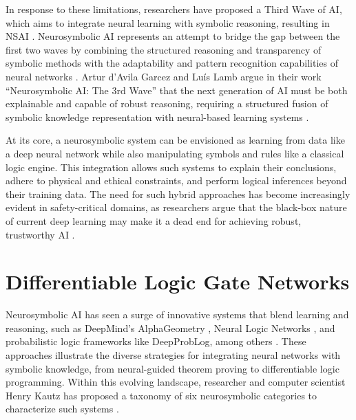 In response to these limitations, researchers have proposed a Third Wave of AI, which aims to integrate neural learning with symbolic reasoning, resulting in NSAI \cite{garcez2023neurosymbolic, nsai_trends}. Neurosymbolic AI represents an attempt to bridge the gap between the first two waves by combining the structured reasoning and transparency of symbolic methods with the adaptability and pattern recognition capabilities of neural networks \cite{colelough2025neurosymbolicai2024systematic}. Artur d'Avila Garcez and Luís Lamb argue in their work ``Neurosymbolic AI: The 3rd Wave'' that the next generation of AI must be both explainable and capable of robust reasoning, requiring a structured fusion of symbolic knowledge representation with neural-based learning systems \cite{garcez2023neurosymbolic}. 

At its core, a neurosymbolic system can be envisioned as learning from data like a deep neural network while also manipulating symbols and rules like a classical logic engine. This integration allows such systems to explain their conclusions, adhere to physical and ethical constraints, and perform logical inferences beyond their training data. The need for such hybrid approaches has become increasingly evident in safety-critical domains, as researchers argue that the black-box nature of current deep learning may make it a dead end for achieving robust, trustworthy AI \cite{refId0, marcus2022deeparticle}.  


\section{Differentiable Logic Gate Networks}
\label{sec:sec_difflogic}

Neurosymbolic AI has seen a surge of innovative systems that blend learning and reasoning, such as DeepMind’s AlphaGeometry \cite{53097, chervonyi2025goldmedalistperformancesolvingolympiad}, Neural Logic Networks \cite{shi2019neurallogicnetworks}, and probabilistic logic frameworks like DeepProbLog, among others \cite{manhaeve2018deepproblogneuralprobabilisticlogic}. These approaches illustrate the diverse strategies for integrating neural networks with symbolic knowledge, from neural-guided theorem proving to differentiable logic programming. Within this evolving landscape, researcher and computer scientist Henry Kautz has proposed a taxonomy of six neurosymbolic categories to characterize such systems \cite{Kautz_2022}.

